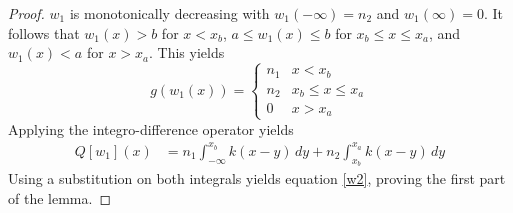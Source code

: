 \documentclass[11pt]{article}
\theoremstyle{definition}
\numberwithin{equation}{section}
\numberwithin{thm}{section}
\renewcommand{\a}{a}
\renewcommand{\b}{b}
\newcommand{\m}{n_1}
\newcommand{\mtwo}{n_2}
\begin{document}
\begin{proof}
$w_1$ is monotonically decreasing with $w_1(-\infty)=\mtwo$ and $w_1(\infty)=0$. It follows that $w_1(x)>\b$ for $x<x_\b$, $\a\leq w_1(x)\leq\b$ for $x_\b\leq x\leq x_\a$, and $w_1(x)<\a$ for $x>x_\a$. This yields
\begin{equation}
g(w_1(x)) = \begin{cases}
\m & x < x_\b \\
\mtwo & x_\b \leq x \leq x_\a \\
0 & x > x_\a
\end{cases}
\end{equation}
Applying the integro-difference operator yields
\begin{equation} \label{qw1calculation}
\begin{aligned}
Q[w_1](x) %
&= \m \int_{-\infty}^{x_\b} k(x-y) \, dy + \mtwo \int_{x_\b}^{x_\a} k(x-y) \, dy %
\end{aligned} \end{equation}
Using a substitution on both integrals yields equation \eqref{w2}, proving the first part of the lemma.




\end{proof}
\end{document}
